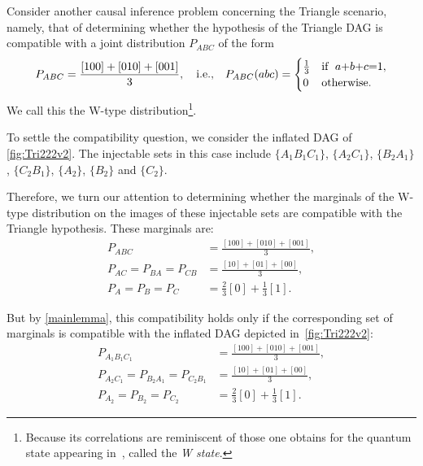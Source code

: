 Consider another causal inference problem concerning the Triangle scenario, namely, that of determining whether the hypothesis of the Triangle DAG is compatible with a joint distribution 
$P_{A B C}$ of the form
\begin{align}\label{eq:wdistribution1}
P_{A B C}=\frac{[100]+[010]+[001]}{3},\quad\text{i.e.,}\quad P_{A B C}(a b c)=\begin{cases}\tfrac{1}{3}&\text{if }\; a\mathord{+}b\mathord{+}c\mathord{=} 1, \\ 0&\text{otherwise}.\end{cases}
\end{align}
We call this the W-type distribution\footnote{Because its correlations are reminiscent of those one obtains for the quantum state appearing in~\cite{3Qubits2Ways}, called the \emph{W state}.}. 

To settle the compatibility question, we consider the inflated DAG of \cref{fig:Tri222v2}.  The injectable sets in this case include $\{A_1 B_1 C_1\}$, $\{A_2 C_1\}$, $\{B_2 A_1\}$, $\{C_2 B_1\}$,  $\{A_2\}$, $\{B_2\}$ and $\{C_2\}$. 

Therefore, we turn our attention to determining whether the marginals of the W-type distribution on the images of these injectable sets are compatible with the Triangle hypothesis.  These marginals are:
\begin{align}
P_{A B C}&= \frac{[100]+[010]+[001]}{3}, \label{V4}\\
P_{A C}= P_{B A} = P_{C B} & = \frac{[10]+[01]+[00]}{3}, \label{V1}\\
P_{A}= P_B = P_C & = \frac{2}{3}[0] + \frac{1}{3}[1]. \label{V5}
\end{align}

But by \cref{mainlemma}, this compatibility holds only if the corresponding set of marginals is compatible with the inflated DAG depicted in~\cref{fig:Tri222v2}:
\begin{align}
P_{A_1 B_1 C_1}&= \frac{[100]+[010]+[001]}{3}, \label{W4}\\
P_{A_2 C_1} = P_{B_2 A_1} = P_{C_2 B_1} & = \frac{[10]+[01]+[00]}{3}, \label{W1}\\
P_{A_2} = P_{B_2} = P_{C_2} & = \frac{2}{3}[0] + \frac{1}{3}[1]. \label{W5}
\end{align}

